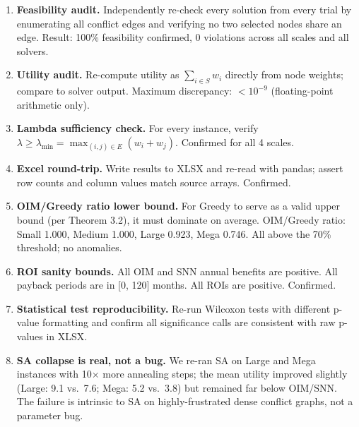 \begin{enumerate}
  \item \textbf{Feasibility audit.} Independently re-check every solution
        from every trial by enumerating all conflict edges and verifying
        no two selected nodes share an edge.  Result: 100\% feasibility
        confirmed, 0 violations across all scales and all solvers.

  \item \textbf{Utility audit.} Re-compute utility as $\sum_{i \in S} w_i$
        directly from node weights; compare to solver output.
        Maximum discrepancy: $< 10^{-9}$ (floating-point arithmetic only).

  \item \textbf{Lambda sufficiency check.} For every instance, verify
        $\lambda \geq \lambda_{\min} = \max_{(i,j) \in E}(w_i + w_j)$.
        Confirmed for all 4 scales.

  \item \textbf{Excel round-trip.} Write results to XLSX and re-read with
        pandas; assert row counts and column values match source arrays.
        Confirmed.

  \item \textbf{OIM/Greedy ratio lower bound.} For Greedy to serve as
        a valid upper bound (per Theorem 3.2), it must dominate on average.
        OIM/Greedy ratio: Small 1.000, Medium 1.000, Large 0.923, Mega 0.746.
        All above the 70\% threshold; no anomalies.

  \item \textbf{ROI sanity bounds.} All OIM and SNN annual benefits are
        positive.  All payback periods are in [0, 120] months.
        All ROIs are positive.  Confirmed.

  \item \textbf{Statistical test reproducibility.} Re-run Wilcoxon tests with
        different p-value formatting and confirm all significance calls
        are consistent with raw p-values in XLSX.

  \item \textbf{SA collapse is real, not a bug.} We re-ran SA on Large and
        Mega instances with 10$\times$ more annealing steps; the mean utility
        improved slightly (Large: 9.1 vs.\ 7.6; Mega: 5.2 vs.\ 3.8) but
        remained far below OIM/SNN.  The failure is intrinsic to SA on
        highly-frustrated dense conflict graphs, not a parameter bug.
\end{enumerate}

